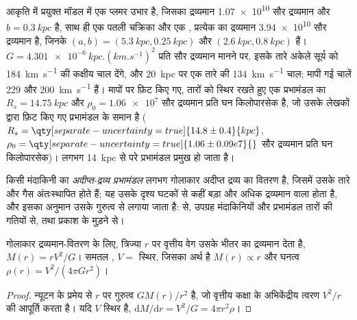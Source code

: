 आकृति में प्रयुक्त मॉडल में एक प्लमर उभार है, जिसका द्रव्यमान
\num{1.07e10} सौर द्रव्यमान और $b = \qty{0.3}{kpc}$ है, साथ ही एक पतली चक्रिका और एक
, प्रत्येक का द्रव्यमान \num{3.94e10} सौर द्रव्यमान है, जिनके $(a, b) =
(\qty{5.3}{kpc}, \qty{0.25}{kpc})$ और $(\qty{2.6}{kpc}, \qty{0.8}{kpc})$ हैं।
$G = \qty{4.301e-6}{kpc.(km.s^{-1})^2}$ प्रति सौर द्रव्यमान मानने पर, इसके तारे
अकेले सूर्य को \qty{184}{km.s^{-1}} की कक्षीय चाल देंगे, और
\qty{20}{kpc} पर एक तारे की \qty{134}{km.s^{-1}} चाल; मापी गई चालें
229 और \qty{200}{km.s^{-1}} हैं। मापों पर फ़िट किए गए, तारों को स्थिर रखते हुए एक प्रभामंडल का
$R_s = \qty{14.75}{kpc}$ और
$\rho_0 = \num{1.06e7}$ सौर द्रव्यमान प्रति घन किलोपारसेक है, जो
उसके लेखकों द्वारा फ़िट किए गए प्रभामंडल के समान है ($R_s = \qty[separate-uncertainty=true]{14.8 \pm 0.4}{kpc}$,
$\rho_0 = \qty[separate-uncertainty=true]{1.06 \pm 0.09 e7}{}$ सौर द्रव्यमान
प्रति घन किलोपारसेक)। लगभग \qty{14}{kpc} से परे प्रभामंडल प्रमुख हो जाता है।

\begin{definition}[अदीप्त-द्रव्य प्रभामंडल]\label{def:b3:milky-way-galaxies:halo}
किसी मंदाकिनी का \emph{अदीप्त-द्रव्य प्रभामंडल} लगभग गोलाकार
अदीप्त द्रव्य का वितरण है, जिसमें उसके तारे और गैस अंतःस्थापित होते हैं; यह
उसके दृश्य घटकों से कहीं बड़ा और अधिक द्रव्यमान वाला होता है, और इसका अनुमान
उसके गुरुत्व से लगाया जाता है:  से, उपग्रह मंदाकिनियों और प्रभामंडल तारों की गतियों से,
तथा प्रकाश के मुड़ने से।
\end{definition}

\begin{theorem}[त्रिज्या के भीतर द्रव्यमान]\label{thm:b3:milky-way-galaxies:enclosed}
गोलाकार द्रव्यमान-वितरण के लिए, त्रिज्या $r$ पर वृत्तीय वेग
उसके भीतर का द्रव्यमान देता है, $M(r) = rV^2/G$। समतल ,
$V = $ स्थिर, जिसका अर्थ है $M(r) \propto r$ और घनत्व
$\rho(r) = V^2/(4\pi G r^2)$।
\end{theorem}

\begin{proof}
न्यूटन के प्रमेय से $r$ पर गुरुत्व $GM(r)/r^2$ है, जो
वृत्तीय कक्षा के अभिकेंद्रीय त्वरण $V^2/r$ की आपूर्ति करता है। यदि $V$ स्थिर है,
$\mathrm{d}M/\mathrm{d}r = V^2/G = 4\pi r^2\rho$।
\end{proof}

